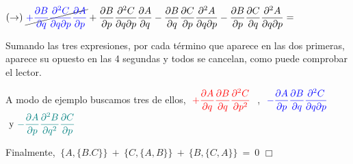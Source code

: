 $\displaystyle (\to) \ 
 \cancel{\textcolor{blue}{+ \pdv{B}{q} \pdv{C}{q}{p} \pdv{A}{p}}} +\pdv{B}{p} \pdv{C}{q}{p} \pdv{A}{q}  -\pdv{B}{q} \pdv{C}{p} \pdv{A}{q}{p}  -\pdv{B}{p} \pdv{C}{q}\pdv{A}{q}{p}   =$
 
\vspace{5mm}
Sumando las tres expresiones, por cada término que aparece en las dos primeras, aparece su opuesto en las 4 segundas y todos se cancelan, como puede comprobar el lector.

A modo de ejemplo buscamos tres de ellos, $\ \displaystyle \textcolor{red}{+\pdv{A}{q} \pdv{B}{q} \pdv[2]{C}{p}} \ $ , $\ \displaystyle \textcolor{blue}{-\pdv{A}{p} \pdv{B}{q}\pdv{C}{q}{p} } $ $\text{ y } \textcolor{teal}{\displaystyle -\pdv{A}{p} \pdv[2]{B}{q}\pdv{C}{p}}$

\vspace{5mm} Finalmente, $\ \{A,\{B.C\}\} \ + \ \{C,\{A,B\}\} \ + \  \{B,\{C,A\}\} \ = \ 0 $ \hspace{7cm} $\Box$


 
\color{black}






